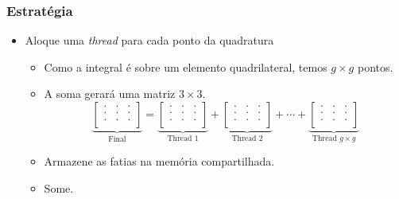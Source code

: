 \documentclass{beamer}
\begin{document}
\begin{frame}
\frametitle{Estratégia}
\begin{itemize}
\item Aloque uma \textit{thread} para cada ponto da quadratura
	\begin{itemize}
	\item Como a integral é sobre um elemento quadrilateral, temos $g \times g$ pontos.
	\item A soma gerará uma matriz $3 \times 3$.
\[
  \underbrace{
  \left[\begin{array}{ccc}
         . & . & .\\
         . & . & .\\
         . & . & .\\
  \end{array}\right]
  }_{\text{Final}}
    =
  \underbrace{ 
  \left[\begin{array}{ccc}
         . & . & .\\
         . & . & .\\
         . & . & .\\
  \end{array}\right]
  }_{\text{Thread 1}}
    +
  \underbrace{
  \left[\begin{array}{ccc}
         . & . & .\\
         . & . & .\\
         . & . & .\\
  \end{array}\right]
  }_{\text{Thread 2}}
    +
   \cdots
    +
  \underbrace{
  \left[\begin{array}{ccc}
         . & . & .\\
         . & . & .\\
         . & . & .\\
  \end{array}\right]
  }_{\text{Thread } g \times g}

\]

\item Armazene as fatias na memória compartilhada.
\item Some.

\end{itemize}

\end{itemize}
\end{frame}

\end{document}
